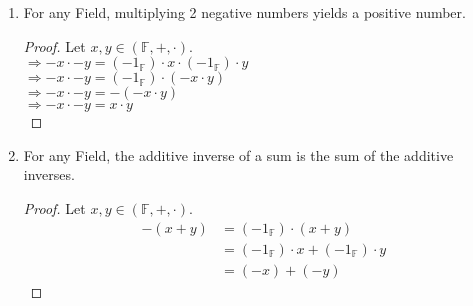 \documentclass{article}
\begin{document}
\begin{enumerate}
\begin{proof}
					$\Rightarrow -1_\mathbb{F} \cdot x + x = -1_\mathbb{F} \cdot x + 1_\mathbb{F} \cdot x$. \\
					$\Rightarrow -1_\mathbb{F} \cdot x + x = (-1_\mathbb{F} \cdot + 1_\mathbb{F}) \cdot x$. \\
					$\Rightarrow -1_\mathbb{F} \cdot x + x = 0_\mathbb{F} \cdot x$. \\
					$\Rightarrow -1_\mathbb{F} \cdot x + x = 0_\mathbb{F}$. \\

					$\Rightarrow x \cdot -1_\mathbb{F} + x = x \cdot -1_\mathbb{F} + x \cdot 1_\mathbb{F}$. \\
					$\Rightarrow x \cdot -1_\mathbb{F} + x = x \cdot (-1_\mathbb{F} \cdot + 1_\mathbb{F})$. \\
					$\Rightarrow x \cdot -1_\mathbb{F} + x = x \cdot 0_\mathbb{F}$. \\
					$\Rightarrow x \cdot -1_\mathbb{F} + x = 0_\mathbb{F}$. \\

					$\Rightarrow -x = -1_\mathbb{F} \cdot x = x \cdot -1_\mathbb{F}$, since all three are solutions to same equation:
					$$x + y = z: y = x, z = 0_\mathbb{F}$$
				\end{proof}

				\item For any Field, multiplying 2 negative numbers yields a positive number.
				\begin{proof}
					Let $x, y \in (\mathbb{F}, +, \cdot)$.\\
					$\Rightarrow -x \cdot -y = (-1_\mathbb{F}) \cdot x \cdot (-1_\mathbb{F}) \cdot y$\\
					$\Rightarrow -x \cdot -y = (-1_\mathbb{F}) \cdot (-x \cdot  y)$\\
					$\Rightarrow -x \cdot -y = -(-x \cdot  y)$\\
					$\Rightarrow -x \cdot -y = x \cdot  y$\\
				\end{proof}

				\item For any Field, the additive inverse of a sum is the sum of the additive inverses. \\
				\begin{proof}
					Let $x, y \in (\mathbb{F}, +, \cdot)$.
					\begin{align*}
						-(x + y) &= (-1_\mathbb{F}) \cdot (x + y) \\
									&= (-1_\mathbb{F}) \cdot x + (-1_\mathbb{F}) \cdot  y \\
									&= (-x) + (-y)
					\end{align*}
				\end{proof}


\end{enumerate}
\end{document}
